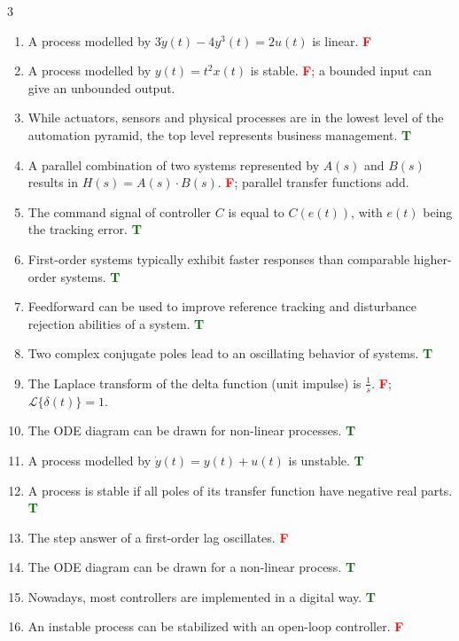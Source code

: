\documentclass[9pt, landscape, a4paper]{article}
\begin{document}
\begin{multicols*}{3}
\begin{enumerate}[leftmargin=*, itemsep=2pt, parsep=1pt]
    \item A process modelled by $3\dot{y}(t)-4y^3(t)=2u(t)$ is linear. \textbf{\textcolor{red}{F}}
    \item A process modelled by $y(t)=t^2x(t)$ is stable. \textbf{\textcolor{red}{F}}; a bounded input can give an unbounded output.
    \item While actuators, sensors and physical processes are in the lowest level of the automation pyramid, the top level represents business management. \textbf{\textcolor{darkgreen}{T}}
    \item A parallel combination of two systems represented by $A(s)$ and $B(s)$ results in $H(s)=A(s)\cdot B(s)$. \textbf{\textcolor{red}{F}}; parallel transfer functions add.
    \item The command signal of controller $C$ is equal to $C(e(t))$, with $e(t)$ being the tracking error. \textbf{\textcolor{darkgreen}{T}}
    \item First-order systems typically exhibit faster responses than comparable higher-order systems. \textbf{\textcolor{darkgreen}{T}}
    \item Feedforward can be used to improve reference tracking and disturbance rejection abilities of a system. \textbf{\textcolor{darkgreen}{T}}
    \item Two complex conjugate poles lead to an oscillating behavior of systems. \textbf{\textcolor{darkgreen}{T}}
    \item The Laplace transform of the delta function (unit impulse) is $\frac{1}{s}$. \textbf{\textcolor{red}{F}}; $\mathcal{L}\{\delta(t)\}=1$.
    \item The ODE diagram can be drawn for non-linear processes. \textbf{\textcolor{darkgreen}{T}}
    \item A process modelled by $\dot{y}(t)=y(t)+u(t)$ is unstable. \textbf{\textcolor{darkgreen}{T}}
    \item A process is stable if all poles of its transfer function have negative real parts. \textbf{\textcolor{darkgreen}{T}}
    \item The step answer of a first-order lag oscillates. \textbf{\textcolor{red}{F}}
    \item The ODE diagram can be drawn for a non-linear process. \textbf{\textcolor{darkgreen}{T}}
    \item Nowadays, most controllers are implemented in a digital way. \textbf{\textcolor{darkgreen}{T}}
    \item An instable process can be stabilized with an open-loop controller. \textbf{\textcolor{red}{F}}

\end{enumerate}
\end{multicols*}
\end{document}
